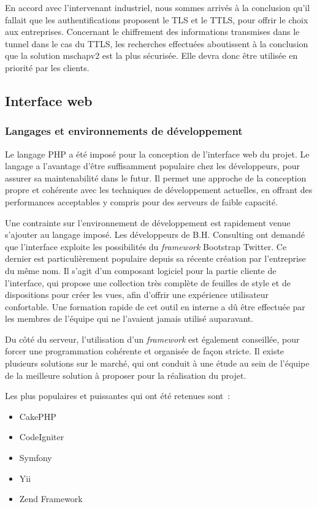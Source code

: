 En accord avec l'intervenant industriel, nous sommes arrivés à la conclusion qu'il fallait que les authentifications proposent le TLS et le TTLS, pour offrir le choix aux entreprises. Concernant le chiffrement des informations transmises dans le tunnel dans le cas du TTLS, les recherches effectuées aboutissent à la conclusion que la solution mschapv2 est la plus sécurisée. Elle devra donc être utilisée en priorité par les clients.

\subsection{Interface web}
\subsubsection{Langages et environnements de développement}

Le langage PHP a été imposé pour la conception de l'interface web du projet. Le langage a l'avantage d'être suffisamment populaire chez les développeurs, pour assurer sa maintenabilité dans le futur. Il permet une approche de la conception propre et cohérente avec les techniques de développement actuelles, en offrant des performances acceptables y compris pour des serveurs de faible capacité.

Une contrainte sur l'environnement de développement est rapidement venue s'ajouter au langage imposé. Les développeurs de B.H. Consulting ont demandé que l'interface exploite les possibilités du \textit{framework} Bootstrap Twitter. Ce dernier est particulièrement populaire depuis sa récente création par l'entreprise du même nom. Il s'agit d'un composant logiciel pour la partie cliente de l'interface, qui propose une collection très complète de feuilles de style et de dispositions pour créer les vues, afin d'offrir une expérience utilisateur confortable. Une formation rapide de cet outil en interne a dû être effectuée par les membres de l'équipe qui ne l'avaient jamais utilisé auparavant.

Du côté du serveur, l'utilisation d'un \textit{framework} est également conseillée, pour forcer une programmation cohérente et organisée de façon stricte. Il existe plusieurs solutions sur le marché, qui ont conduit à une étude au sein de l'équipe de la meilleure solution à proposer pour la réalisation du projet.

Les plus populaires et puissantes qui ont été retenues sont~:

\begin{itemize}
\item CakePHP
\item CodeIgniter
\item Symfony
\item Yii
\item Zend Framework
\end{itemize}


